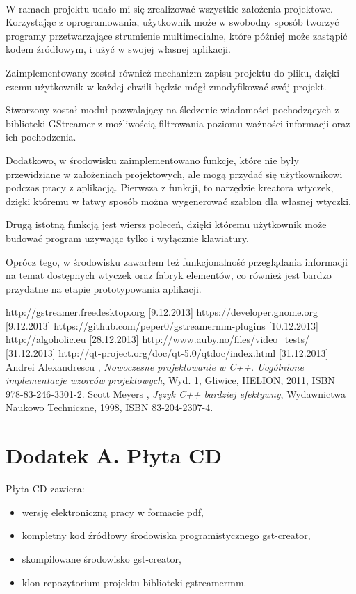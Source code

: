 \documentclass[12pt]{article}
\begin{document}
\paragraph{}W ramach projektu udało mi się zrealizować wszystkie założenia projektowe. Korzystając z oprogramowania, użytkownik może w swobodny sposób tworzyć programy przetwarzające strumienie multimedialne, które później może zastąpić kodem źródłowym, i użyć w swojej własnej aplikacji. 

Zaimplementowany został również mechanizm zapisu projektu do pliku, dzięki czemu użytkownik w każdej chwili będzie mógł zmodyfikować swój projekt. 

Stworzony został moduł pozwalający na śledzenie wiadomości pochodzących z biblioteki GStreamer z możliwością filtrowania poziomu ważności informacji oraz ich pochodzenia.

Dodatkowo, w środowisku zaimplementowano funkcje, które nie były przewidziane w założeniach projektowych, ale mogą przydać się użytkownikowi podczas pracy z aplikacją. Pierwsza z funkcji, to narzędzie kreatora wtyczek, dzięki któremu w łatwy sposób można wygenerować szablon dla własnej wtyczki. 

Drugą istotną funkcją jest wiersz poleceń, dzięki któremu użytkownik może budować program używając tylko i wyłącznie klawiatury.

Oprócz tego, w środowisku zawarłem też funkcjonalność przeglądania informacji na temat dostępnych wtyczek oraz fabryk elementów, co również jest bardzo przydatne na etapie prototypowania aplikacji.
\cleardoublepage
{}
\begin{thebibliography}{9}

  http://gstreamer.freedesktop.org [9.12.2013]
  https://developer.gnome.org [9.12.2013]
  https://github.com/peper0/gstreamermm-plugins [10.12.2013]
  http://algoholic.eu [28.12.2013]
  http://www.auby.no/files/video\_tests/ [31.12.2013]
  http://qt-project.org/doc/qt-5.0/qtdoc/index.html [31.12.2013]
  Andrei Alexandrescu , \textit{Nowoczesne projektowanie w C++. Uogólnione implementacje wzorców projektowych}, Wyd. 1, Gliwice, HELION, 2011, ISBN 978-83-246-3301-2.
  Scott Meyers , \textit{Język C++ bardziej efektywny}, Wydawnictwa Naukowo Techniczne, 1998, ISBN 83-204-2307-4.
\end{thebibliography}
\cleardoublepage
\appendix
{}
\section*{Dodatek A. Płyta CD}
Płyta CD zawiera:
\begin{itemize}
 \setlength{\itemsep}{0em}
\item wersję elektroniczną pracy w formacie pdf,
\item kompletny kod źródłowy środowiska programistycznego gst-creator,
\item skompilowane środowisko gst-creator,
\item klon repozytorium projektu biblioteki gstreamermm.
\end{itemize}
\end{document}
